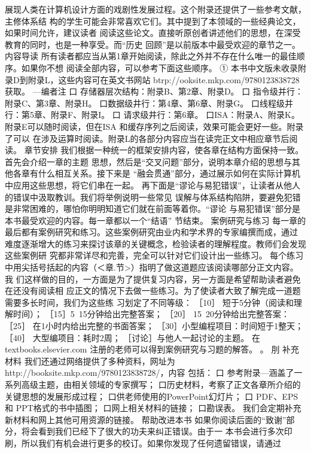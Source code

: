 展现人类在计算机设计方面的戏剧性发展过程。这个附录还提供了一些参考文献，主修体系结
构的学生可能会非常喜欢它们。其中提到了本领域的一些经典论文，如果时间允许，建议读者
阅读这些论文。直接听原创者讲述他们的思想，在深受教育的同时，也是一种享受。而“历史
回顾”是以前版本中最受欢迎的章节之一。
内容导读
所有读者都应当从第1章开始阅读，除此之外并不存在什么唯一的最佳顺序。如果你不想
阅读全部内容，可以参考下面这些顺序。
① 本书中文版未收录附录D到附录L，这些内容可在英文书网站 btrp://ooksite.mkp.com/9780123838728获取。
—编者注
口 存储器层次结构：附录B、第2章、附录D。
口 指令级并行：附录C、第3章、附录H。
口数据级井行：第4章、第6章、附录G。
口线程级并行：第5章、附录F、附录I。
口 请求级井行：第6章。
口ISA：附录A、附录K。
附录E可以随时阅读，但在ISA 和缓存序列之后阅读，效果可能会更好一些。附录了可以
在涉及运算时阅读。附录L的各部分内容应当在读完正文中相应章节后阅读。
章节安排
我们根据一种统一的框架安排内容，使各章在结构方面保持一致。首先会介绍一章的主题
思想，然后是“交叉问题”部分，说明本章介绍的思想与其他各章有什么相互关系。接下来是
“融会贯通”部分，通过展示如何在实际计算机中应用这些思想，将它们串在一起。
再下面是“谬论与易犯错误”，让读者从他人的错误中汲取教训。我们将举例说明一些常见
误解与体系结构陷阱，要避免犯错是非常困难的，哪怕你明明知道它们就在前面等着你。“谬论
与易犯错误”部分是本书最受欢迎的内容。每一章都以一个“结语” 节结束。
案例研究与练习
每一章的最后都有案例研究和练习。这些案例研究由业内和学术界的专家编撰而成，通过
难度逐渐增大的练习来探讨该章的关键概念，检验读者的理解程度。教师们会发现这些案例研
究都非常详尽和完善，完全可以针对它们设计出一些练习。
每个练习中用尖括号括起的内容（＜章.节>）指明了做这道题应该阅读哪部分正文内容。我
们这样做的目的，一方面是为了提供复习内容，另一方面是希望帮助读者避免在还没有阅读相
应正文的情况下去做一些练习。为了使读者大致了解完成一道题需要多长时间，我们为这些练
习划定了不同等级：
［10］ 短于5分钟（阅读和理解时间）；
［15］5~15分钟给出完整答案；
［20］ 15~20分钟给出完整答案：
［25］ 在1小时内给出完整的书面答案；
［30］小型编程项目：时间短于1整天；
［40］ 大型编项目：耗时2周；
［讨论］与他人一起讨论的主题。
在 textbooks.elsevier.com 注册的老师可以得到案例研究与习题的解答。
。
刖
补充材料
我们还通过网络提供了多种资料，网址为 http://booksite.mkp.com/9780123838728/，内容
包括：
口 参考附录—涵盖了一系列高级主题，由相关领域的专家撰写；
口历史材料，考察了正文各章所介绍的关键思想的发展形成过程；
口供老师使用的PowerPoint幻灯片；
口 PDF、EPS和 PPT格式的书中插图；
口网上相关材料的链接；
口勘误表。
我们会定期补充新材料和网上其他可用资源的链接。
帮助改进本书
如果你阅读后面的“致谢”部分，将会看到我们已经下了很大的功夫来纠正错误。由于一
本书会进行多次印刷，所以我们有机会进行更多的校订。如果你发现了任何遗留错误，请通过
